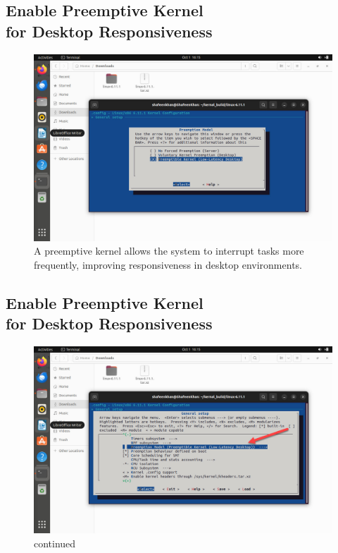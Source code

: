 \documentclass{article}
\begin{document}
\subsection{Enable Preemptive Kernel \\for Desktop Responsiveness}
\begin{figure}[H]
    \centering
    \includegraphics[width=0.8\linewidth]{38.jpg}
    \caption{A preemptive kernel allows the system to interrupt tasks more frequently, improving responsiveness in desktop environments.
}
\end{figure}

\subsection{Enable Preemptive Kernel \\for Desktop Responsiveness}
\begin{figure}[H]
    \centering
    \includegraphics[width=0.8\linewidth]{36.jpg}
    \caption{continued}
\end{figure}
\end{document}
